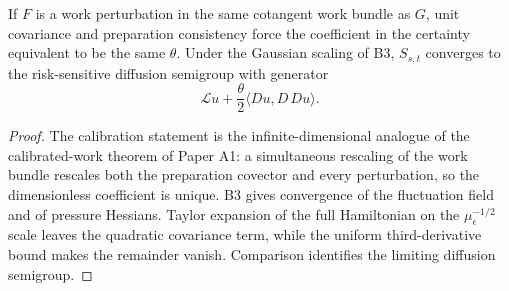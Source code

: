 \begin{theorem}
\label{thm:rr2-b4-theta}
If \(F\) is a work perturbation in the same cotangent work bundle as \(G\),
unit covariance and preparation consistency force the coefficient in the
certainty equivalent to be the same \(\theta\).  Under the Gaussian scaling
of B3, \(S_{s,t}\) converges to the risk-sensitive diffusion semigroup with
generator
\[
 \mathcal L u+\frac{\theta}{2}
 \langle Du,D\,Du\rangle.
\]
\end{theorem}

\begin{proof}
The calibration statement is the infinite-dimensional analogue of
the calibrated-work theorem of Paper A1: a simultaneous rescaling of the work
bundle rescales both the preparation covector and every perturbation, so the
dimensionless coefficient is unique.  B3 gives convergence of the
fluctuation field and of pressure Hessians.  Taylor expansion of the full
Hamiltonian on the \(\mu_\epsilon^{-1/2}\) scale leaves the quadratic
covariance term, while the uniform third-derivative bound makes the
remainder vanish.  Comparison identifies the limiting diffusion semigroup.
\end{proof}
